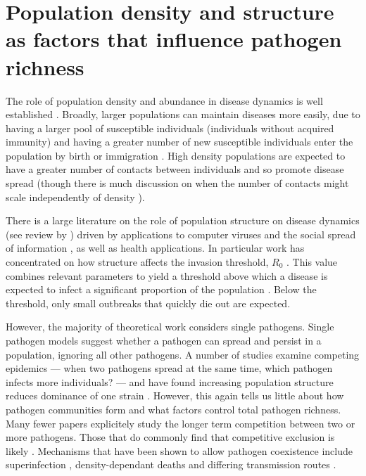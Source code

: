 \section{Population density and structure as factors that influence pathogen richness}




The role of population density and abundance in disease dynamics is well established \cite{may1979population, anderson1979population, heesterbeek2002brief, lloyd2005should}.
Broadly, larger populations can maintain diseases more easily, due to having a larger pool of susceptible individuals (individuals without acquired immunity) and having a greater number of new susceptible individuals enter the population by birth or immigration \cite{may1979population, anderson1979population}.
High density populations are expected to have a greater number of contacts between individuals and so promote disease spread (though there is much discussion on when the number of contacts might scale independently of density \cite{mccallum2001should}).


There is a large literature on the role of population structure on disease dynamics (see review by \textcite{pastor2015epidemic}) driven by applications to computer viruses \cite{pastor2001epidemic} and the social spread of information \cite{goffman1964generalization}, as well as health applications.
In particular work has concentrated on how structure affects the invasion threshold, $R_0$ \cite{colizza2007invasion, barthelemy2010fluctuation, wu2013threshold, may2001infection, pastor2001epidemic}. 
This value combines relevant parameters to yield a threshold above which a disease is expected to infect a significant proportion of the population \cite{may1979population, anderson1979population}.
Below the threshold, only small outbreaks that quickly die out are expected.

However, the majority of theoretical work considers single pathogens.
Single pathogen models suggest whether a pathogen can spread and persist in a population, ignoring all other pathogens.
A number of studies examine competing epidemics --- when two pathogens spread at the same time, which pathogen infects more individuals? --- and have found increasing population structure reduces dominance of one strain \cite{van2014domination, poletto2013host, poletto2015characterising}.
However, this again tells us little about how pathogen communities form and what factors control total pathogen richness.
Many fewer papers explicitely study the longer term competition between two or more pathogens.
Those that do commonly find that competitive exclusion is likely \cite{castillo1995dynamics, bremermann1989competitive, martcheva2013competitive, ackleh2003competitive, ackleh2014robust, turner2002impact}.
Mechanisms that have been shown to allow pathogen coexistence include superinfection \cite{may1994superinfection, li2010age}, density-dependant deaths \cite{ackleh2003competitive, kirupaharan2004coexistence} and differing transmission routes \cite{allen2003dynamics}.

